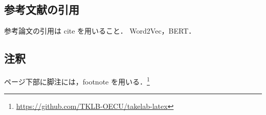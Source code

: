 \subsection{参考文献の引用}

参考論文の引用は cite を用いること．
Word2Vec\cite{mikolov2013w2c}，BERT\cite{devlin2019bert, shortdevlin2019bert}．

\subsection{注釈}
ページ下部に脚注には，footnote を用いる．\footnote{\url{https://github.com/TKLB-OECU/takelab-latex}}
